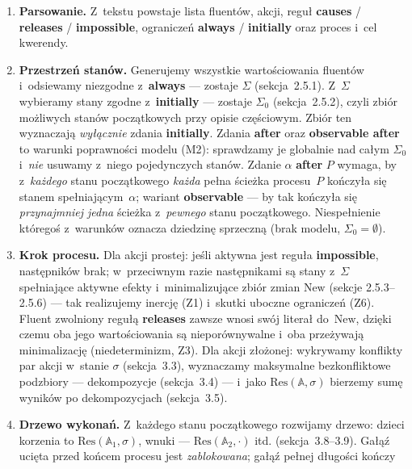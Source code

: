 \documentclass[11pt,a4paper]{article}
\newcommand{\Res}{\mathrm{Res}}
\newcommand{\New}{\mathrm{New}}
\begin{document}
\begin{enumerate}
  \item \textbf{Parsowanie.} Z~tekstu powstaje lista fluentów, akcji, reguł
        \textbf{causes} / \textbf{releases} / \textbf{impossible}, ograniczeń
        \textbf{always} / \textbf{initially} oraz proces i~cel kwerendy.
  \item \textbf{Przestrzeń stanów.} Generujemy wszystkie wartościowania
        fluentów i~odsiewamy niezgodne z~\textbf{always} --- zostaje $\Sigma$
        (sekcja~2.5.1). Z~$\Sigma$ wybieramy stany zgodne z~\textbf{initially}
        --- zostaje $\Sigma_0$ (sekcja~2.5.2), czyli zbiór możliwych stanów
        początkowych przy opisie częściowym. Zbiór ten wyznaczają
        \emph{wyłącznie} zdania \textbf{initially}. Zdania \textbf{after} oraz
        \textbf{observable after} to warunki poprawności modelu (M2): sprawdzamy
        je globalnie nad całym $\Sigma_0$ i~\emph{nie} usuwamy z~niego
        pojedynczych stanów. Zdanie $\alpha$ \textbf{after} $P$ wymaga, by
        z~\emph{każdego} stanu początkowego \emph{każda} pełna ścieżka
        procesu~$P$ kończyła się stanem spełniającym~$\alpha$; wariant
        \textbf{observable} --- by tak kończyła się \emph{przynajmniej jedna}
        ścieżka z~\emph{pewnego} stanu początkowego. Niespełnienie któregoś
        z~warunków oznacza dziedzinę sprzeczną (brak modelu, $\Sigma_0 = \emptyset$).
  \item \textbf{Krok procesu.} Dla akcji prostej: jeśli aktywna jest reguła
        \textbf{impossible}, następników brak; w~przeciwnym razie następnikami
        są stany z~$\Sigma$ spełniające aktywne efekty i~minimalizujące zbiór
        zmian $\New$ (sekcje 2.5.3--2.5.6) --- tak realizujemy inercję (Z1)
        i~skutki uboczne ograniczeń (Z6). Fluent zwolniony regułą
        \textbf{releases} zawsze wnosi swój literał do~$\New$, dzięki czemu oba
        jego wartościowania są nieporównywalne i~oba przeżywają minimalizację
        (niedeterminizm, Z3). Dla akcji złożonej: wykrywamy konflikty par akcji
        w~stanie $\sigma$ (sekcja~3.3), wyznaczamy maksymalne bezkonfliktowe
        podzbiory --- dekompozycje (sekcja~3.4) --- i~jako
        $\Res(\mathbb{A},\sigma)$ bierzemy sumę wyników po dekompozycjach
        (sekcja~3.5).
  \item \textbf{Drzewo wykonań.} Z~każdego stanu początkowego rozwijamy
        drzewo: dzieci korzenia to $\Res(\mathbb{A}_1,\sigma)$, wnuki ---
        $\Res(\mathbb{A}_2,\cdot)$ itd. (sekcja~3.8--3.9). Gałąź ucięta przed
        końcem procesu jest \emph{zablokowana}; gałąź pełnej długości kończy

\end{enumerate}
\end{document}
